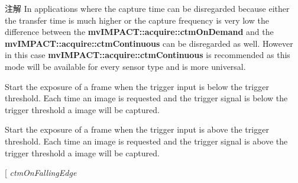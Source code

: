 \begin{Desc}
\begin{description}
\begin{DoxyNote}{注解}
In applications where the capture time can be disregarded because either the transfer time is much higher or the capture frequency is very low the difference between the {\bfseries mv\+I\+M\+P\+A\+C\+T\+::acquire\+::ctm\+On\+Demand} and the {\bfseries mv\+I\+M\+P\+A\+C\+T\+::acquire\+::ctm\+Continuous} can be disregarded as well. However in this case {\bfseries mv\+I\+M\+P\+A\+C\+T\+::acquire\+::ctm\+Continuous} is recommended as this mode will be available for every sensor type and is more universal. 
\end{DoxyNote}
\item[{\em 
\hypertarget{group___device_specific_interface_gga7d880247a3af52241ce96ba703c526a1a14b55001b77826cb00fe8aadf23010ed}{ctm\+On\+Low\+Level}\label{group___device_specific_interface_gga7d880247a3af52241ce96ba703c526a1a14b55001b77826cb00fe8aadf23010ed}
}]Start the exposure of a frame when the trigger input is below the trigger threshold. Each time an image is requested and the trigger signal is below the trigger threshold a image will be captured. \item[{\em 
\hypertarget{group___device_specific_interface_gga7d880247a3af52241ce96ba703c526a1a1b5073010197376b5485a6e5af9bd58d}{ctm\+On\+High\+Level}\label{group___device_specific_interface_gga7d880247a3af52241ce96ba703c526a1a1b5073010197376b5485a6e5af9bd58d}
}]Start the exposure of a frame when the trigger input is above the trigger threshold. Each time an image is requested and the trigger signal is above the trigger threshold a image will be captured. \item[{\em 
\hypertarget{group___device_specific_interface_gga7d880247a3af52241ce96ba703c526a1a56d4499d83f15ce1dd71c3704c8c465a}{ctm\+On\+Falling\+Edge}\label{group___device_specific_interface_gga7d880247a3af52241ce96ba703c526a1a56d4499d83f15ce1dd71c3704c8c465a}
}
\end{description}
\end{Desc}
